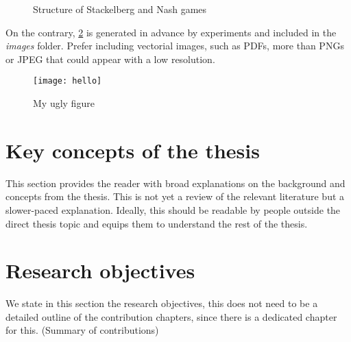\begin{figure}[ht]
\caption{Structure of Stackelberg and Nash games}
\label{fig:stacknnash}
\end{figure}


On the contrary, \cref{fig:hello} is generated in advance by experiments and included
in the \textit{images} folder. Prefer including vectorial images, such as PDFs,
more than PNGs or JPEG that could appear with a low resolution.

\begin{figure}
  \texttt{[image: hello]}
  \caption{My ugly figure}
  \label{fig:hello}
\end{figure}

\section{Key concepts of the thesis}

This section provides the reader with broad explanations on the background and concepts from the thesis.
This is not yet a review of the relevant literature but a slower-paced explanation.
Ideally, this should be readable by people outside the direct thesis topic and equips them to understand the rest of the thesis.

\section{Research objectives}

We state in this section the research objectives, this does not need to be a detailed outline of the contribution chapters, since there is a dedicated chapter for this. (Summary of contributions)
